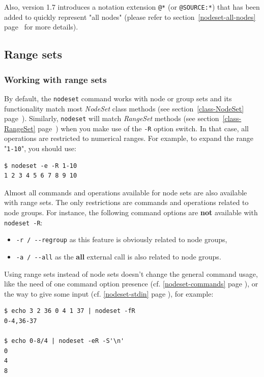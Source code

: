 \documentclass[english,a4paper]{csuserguide}
\newcommand{\NodeSet}{\textit{NodeSet}\xspace}
\newcommand{\nodeset}{\texttt{nodeset}\xspace}
\begin{document}
Also, version 1.7 introduces a notation extension \verb+@*+ (or \verb+@SOURCE:*+) that has been added to quickly represent "all nodes" (please refer to section~\ref{nodeset-all-nodes} page~\pageref{nodeset-all-nodes} for more details).

\subsection{Range sets}
\label{nodeset-rangeset}

\subsubsection{Working with range sets}
By default, the \nodeset command works with node or group sets and its functionality match most \NodeSet class methods (see section~\ref{class-NodeSet} page~\pageref{class-NodeSet}). Similarly, \nodeset will match \textit{RangeSet} methods (see section~\ref{class-RangeSet} page~\pageref{class-RangeSet}) when you make use of the \verb+-R+ option switch. In that case, all operations are restricted to numerical ranges. For example, to expand the range "\verb+1-10+", you should use:

\medskip
\begin{lstlisting}[breaklines=true, breakatwhitespace=true]
$ nodeset -e -R 1-10
1 2 3 4 5 6 7 8 9 10
\end{lstlisting}

Almost all commands and operations available for node sets are also available with range sets. The only restrictions are commands and operations related to node groups. For instance, the following command options are \textbf{not} available with \lstinline+nodeset -R+:
\begin{itemize}
\item{\verb+-r / --regroup+ as this feature is obviously related to node groups,}
\item{\verb+-a / --all+ as the \textbf{all} external call is also related to node groups.}
\end{itemize}

\pagebreak[4]

Using range sets instead of node sets doesn't change the general command usage, like the need of one command option presence (cf. \ref{nodeset-commands} page \pageref{nodeset-commands}), or the way to give some input (cf. \ref{nodeset-stdin} page \pageref{nodeset-stdin}), for example:
\medskip
\begin{lstlisting}[breaklines=true, breakatwhitespace=true]
$ echo 3 2 36 0 4 1 37 | nodeset -fR
0-4,36-37

$ echo 0-8/4 | nodeset -eR -S'\n'
0
4
8
\end{lstlisting}
\end{document}
